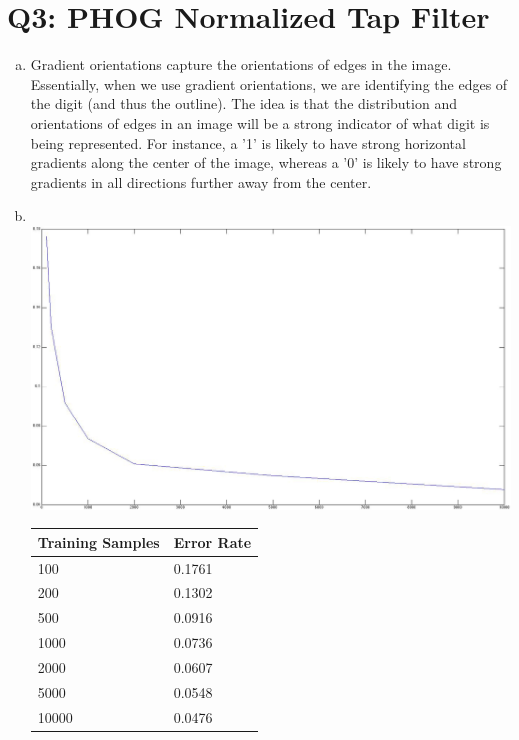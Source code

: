 \documentclass[12pt]{article}
\begin{document}
\newpage
\section*{Q3: PHOG Normalized Tap Filter}
  \begin{enumerate}[a.]
    \item Gradient orientations capture the orientations of edges in the
      image. Essentially, when we use gradient orientations, we are identifying
      the edges of the digit (and thus the outline). The idea is that the
      distribution and orientations of edges in an image will be a strong
      indicator of what digit is being represented. For instance, a '1' is
      likely to have strong horizontal gradients along the center of the image,
      whereas a '0' is likely to have strong gradients in all directions further
      away from the center.
    \item \quad \\
      \includegraphics[scale=0.35]{q3_normalized_tap.jpg}
      \begin{tabular}{l|l}
        \hline
        Training Samples & Error Rate \\
        \hline
        100   & 0.1761 \\
        200   & 0.1302 \\
        500   & 0.0916 \\
        1000  & 0.0736 \\
        2000  & 0.0607 \\
        5000  & 0.0548 \\
        10000 & 0.0476 \\
      \end{tabular}
  \end{enumerate}


\newpage
\end{document}
